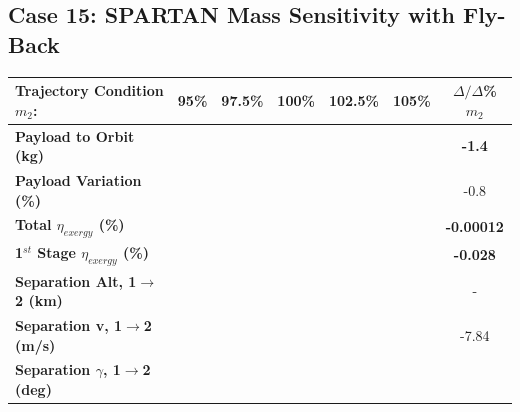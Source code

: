 \subsection{Case 15: SPARTAN Mass Sensitivity with Fly-Back}\label{sec:m2var}


\begin{table}[ht]
\centering
\begin{tabular}{l c c c c c c} 
	\hline \textbf{Trajectory Condition}   \qquad  $m_{2}$:
	&95\%
	&97.5\%
	&100\%
	&102.5\%
	&105\%
	& $\Delta/\Delta$\%$m_{2}$
	\\
	\hline \textbf{Payload to Orbit (kg)}
	& \textbf{\PayloadToOrbitmSPARTANNinetyFive}
	& \textbf{\PayloadToOrbitmSPARTANNinetySevenFive}
	& \textbf{\PayloadToOrbitmSPARTANStandard}
	& \textbf{\PayloadToOrbitmSPARTANOneHundredTwoFive}
	& \textbf{\PayloadToOrbitmSPARTANOneHundredFive}
	&\textbf{-1.4}
	\\
	\textbf{Payload Variation (\%)}
	& \PayloadVarmSPARTANNinetyFive
	& \PayloadVarmSPARTANNinetySevenFive
	& \PayloadVarmSPARTANStandard
	& \PayloadVarmSPARTANOneHundredTwoFive
	& \PayloadVarmSPARTANOneHundredFive
	&-0.8
	\\
	\textbf{Total $\eta_{exergy}$ (\%)}
	& \textbf{\totalExergyEffmSPARTANNinetyFive}
	& \textbf{\totalExergyEffmSPARTANNinetySevenFive}
	& \textbf{\totalExergyEffmSPARTANStandard}
	& \textbf{\totalExergyEffmSPARTANOneHundredTwoFive}
	& \textbf{\totalExergyEffmSPARTANOneHundredFive}
	& \textbf{-0.00012}
	\\
	\hline 
	\textbf{1$^{st}$ Stage $\eta_{exergy}$ (\%)}
	& \textbf{\firstExergyEffmSPARTANNinetyFive}
	& \textbf{\firstExergyEffmSPARTANNinetySevenFive}
	& \textbf{\firstExergyEffmSPARTANStandard}
	& \textbf{\firstExergyEffmSPARTANOneHundredTwoFive}
	& \textbf{\firstExergyEffmSPARTANOneHundredFive}
	& \textbf{-0.028}
	\\
	\textbf{Separation Alt, 1$\rightarrow$2 (km)}
	& \firstsecondSeparationAltmSPARTANNinetyFive
	& \firstsecondSeparationAltmSPARTANNinetySevenFive
	& \firstsecondSeparationAltmSPARTANStandard
	& \firstsecondSeparationAltmSPARTANOneHundredTwoFive
	& \firstsecondSeparationAltmSPARTANOneHundredFive
	& -
	\\
	\textbf{Separation v, 1$\rightarrow$2 (m/s)}
	& \firstsecondSeparationvmSPARTANNinetyFive
	& \firstsecondSeparationvmSPARTANNinetySevenFive
	& \firstsecondSeparationvmSPARTANStandard
	& \firstsecondSeparationvmSPARTANOneHundredTwoFive
	& \firstsecondSeparationvmSPARTANOneHundredFive
	&-7.84
	\\
	\textbf{Separation $\gamma$, 1$\rightarrow$2 (deg)}

\end{tabular}
\end{table}
